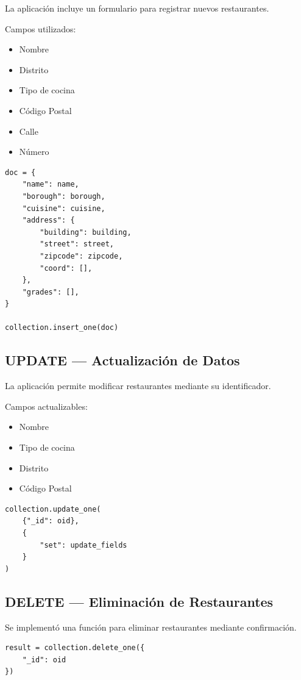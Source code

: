 \documentclass[12pt]{article}
\begin{document}
La aplicación incluye un formulario para registrar nuevos restaurantes.

Campos utilizados:

\begin{itemize}
    \item Nombre
    \item Distrito
    \item Tipo de cocina
    \item Código Postal
    \item Calle
    \item Número
\end{itemize}

\begin{lstlisting}
doc = {
    "name": name,
    "borough": borough,
    "cuisine": cuisine,
    "address": {
        "building": building,
        "street": street,
        "zipcode": zipcode,
        "coord": [],
    },
    "grades": [],
}

collection.insert_one(doc)
\end{lstlisting}


\subsection{UPDATE — Actualización de Datos}

La aplicación permite modificar restaurantes mediante su identificador.

Campos actualizables:

\begin{itemize}
    \item Nombre
    \item Tipo de cocina
    \item Distrito
    \item Código Postal
\end{itemize}

\begin{lstlisting}
collection.update_one(
    {"_id": oid},
    {
        "set": update_fields
    }
)
\end{lstlisting}


\subsection{DELETE — Eliminación de Restaurantes}

Se implementó una función para eliminar restaurantes mediante confirmación.

\begin{lstlisting}
result = collection.delete_one({
    "_id": oid
})
\end{lstlisting}
\end{document}
